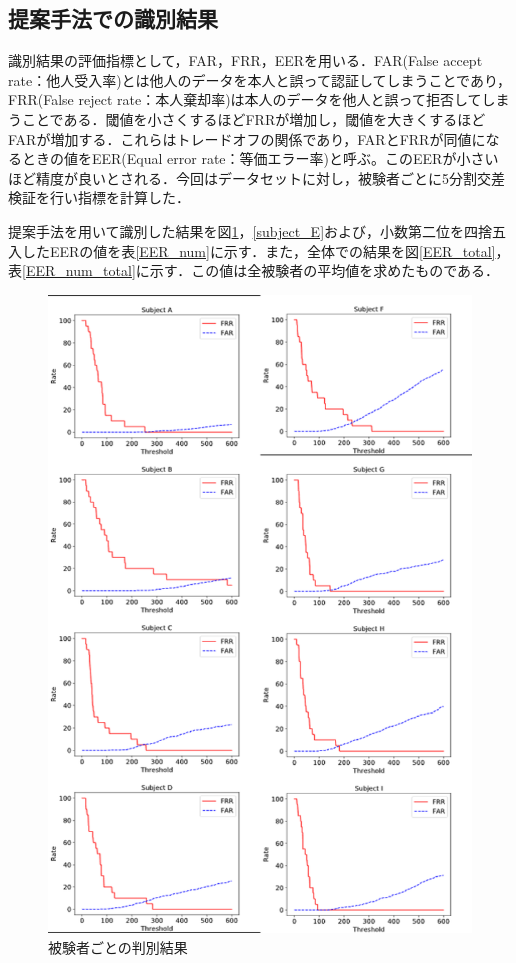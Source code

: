 \documentclass[Japanese]{dicomopapers}
\begin{document}
\subsection{提案手法での識別結果}
識別結果の評価指標として，FAR，FRR，EERを用いる．FAR(False accept rate：他人受入率)とは他人のデータを本人と誤って認証してしまうことであり，FRR(False reject rate：本人棄却率)は本人のデータを他人と誤って拒否してしまうことである．閾値を小さくするほどFRRが増加し，閾値を大きくするほどFARが増加する．これらはトレードオフの関係であり，FARとFRRが同値になるときの値をEER(Equal error rate：等価エラー率)と呼ぶ。このEERが小さいほど精度が良いとされる．今回はデータセットに対し，被験者ごとに5分割交差検証を行い指標を計算した．\par
提案手法を用いて識別した結果を図\ref{EER_all}，\ref{subject_E}および，小数第二位を四捨五入したEERの値を表\ref{EER_num}に示す．また，全体での結果を図\ref{EER_total}，表\ref{EER_num_total}に示す．この値は全被験者の平均値を求めたものである．

\begin{figure}[!t]
  \begin{center}
    \includegraphics[width=1\linewidth]{figure/EER_all_ver.eps}
  \end{center}
    \vspace{-8mm}
  \caption{被験者ごとの判別結果}
  \label{EER_all}
\end{figure}
\end{document}
